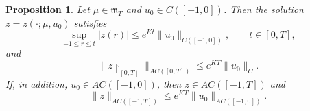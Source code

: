 \documentclass[reqno]{amsart}
\theoremstyle{plain}
\newtheorem{proposition}{Proposition}[section]
\numberwithin{equation}{section}
\numberwithin{definition}{section}
\begin{document}
\begin{proposition}\label{prop:Gronwal-determine-bound}
Let $\mu\in\mathfrak m_T$ and $u_0\in C([-1,0])$.
Then the solution $z=z(\cdot;\mu,u_0)$ satisfies
\begin{equation*}
    \sup_{-1\leq r\leq t}|z(r)|
    \leq e^{Kt}\|u_0\|_{C([-1,0])},
    \qquad t\in[0,T],
\end{equation*}
and
\begin{equation*}
    \|z{\restriction}_{[0,T]}\|_{AC([0,T])}
    \leq e^{KT}\|u_0\|_C.
\end{equation*}
If, in addition, $u_0\in AC([-1,0])$, then
$z\in AC([-1,T])$ and
\begin{equation*}
    \|z\|_{AC([-1,T])}
    \leq e^{KT}\|u_0\|_{AC([-1,0])}.
\end{equation*}
\end{proposition}
\end{document}

